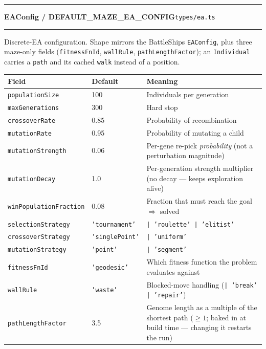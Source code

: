 \documentclass[11pt,a4paper]{report}
\newcommand{\srcfile}[1]{\texttt{\small #1}}   %
\newcommand{\ts}[1]{\texttt{#1}}               %
\newenvironment{apientry}[2]{%
  \par\medskip\noindent
  \begin{minipage}{\textwidth}
  \hrule\vspace{0.6ex}
  {\large\ttfamily\bfseries #1}\hfill{\footnotesize\srcfile{#2}}
  \vspace{0.4ex}\hrule\medskip
}{%
  \end{minipage}\par\medskip
}
\begin{document}
\begin{apientry}{EAConfig / DEFAULT\_MAZE\_EA\_CONFIG}{types/ea.ts}
Discrete-EA configuration. Shape mirrors the BattleShips \ts{EAConfig},
plus three maze-only fields (\ts{fitnessFnId}, \ts{wallRule},
\ts{pathLengthFactor}); an \ts{Individual} carries a \ts{path} and its
cached \ts{walk} instead of a position.
\begin{center}
\begin{tabularx}{\textwidth}{l l X}
  \toprule
  \textbf{Field} & \textbf{Default} & \textbf{Meaning} \\
  \midrule
  \ts{populationSize}    & 100  & Individuals per generation \\
  \ts{maxGenerations}    & 300  & Hard stop \\
  \ts{crossoverRate}     & 0.85 & Probability of recombination \\
  \ts{mutationRate}      & 0.95 & Probability of mutating a child \\
  \ts{mutationStrength}  & 0.06 & Per-gene re-pick \emph{probability} (not a
                                  perturbation magnitude) \\
  \ts{mutationDecay}     & 1.0  & Per-generation strength multiplier (no
                                  decay --- keeps exploration alive) \\
  \ts{winPopulationFraction} & 0.08 & Fraction that must reach the goal
                                  $\Rightarrow$ solved \\
  \ts{selectionStrategy} & \ts{'tournament'} & \ts{| 'roulette' | 'elitist'} \\
  \ts{crossoverStrategy} & \ts{'singlePoint'} & \ts{| 'uniform'} \\
  \ts{mutationStrategy}  & \ts{'point'} & \ts{| 'segment'} \\
  \ts{fitnessFnId}       & \ts{'geodesic'} & Which fitness function the
                                  problem evaluates against \\
  \ts{wallRule}          & \ts{'waste'} & Blocked-move handling
                                  (\ts{| 'break' | 'repair'}) \\
  \ts{pathLengthFactor}  & 3.5  & Genome length as a multiple of the
                                  shortest path ($\geq 1$; baked in at
                                  build time --- changing it restarts the
                                  run) \\
  \bottomrule
\end{tabularx}
\end{center}
\end{apientry}
\end{document}
